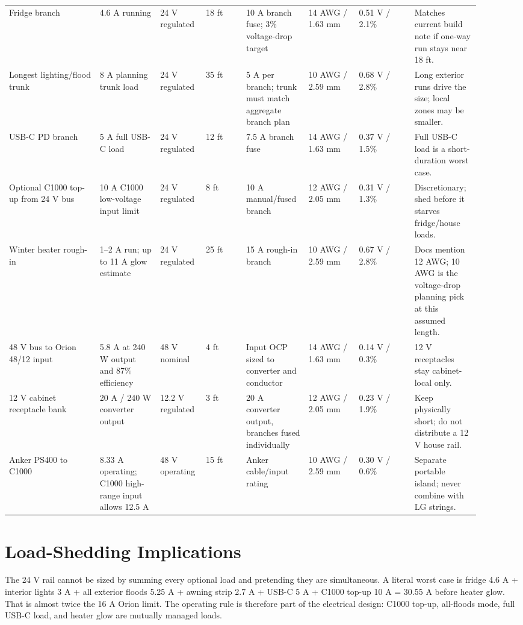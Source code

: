 \documentclass[10pt]{article}
\begin{document}
{\begin{longtable}{@{}L{0.18\linewidth}L{0.12\linewidth}L{0.07\linewidth}L{0.08\linewidth}L{0.12\linewidth}L{0.10\linewidth}L{0.11\linewidth}L{0.13\linewidth}@{}}
Fridge branch & 4.6 A running & 24 V regulated & 18 ft & 10 A branch fuse; 3\% voltage-drop target & 14 AWG / 1.63 mm & 0.51 V / 2.1\% & Matches current build note if one-way run stays near 18 ft. \\
Longest lighting/flood trunk & 8 A planning trunk load & 24 V regulated & 35 ft & 5 A per branch; trunk must match aggregate branch plan & 10 AWG / 2.59 mm & 0.68 V / 2.8\% & Long exterior runs drive the size; local zones may be smaller. \\
USB-C PD branch & 5 A full USB-C load & 24 V regulated & 12 ft & 7.5 A branch fuse & 14 AWG / 1.63 mm & 0.37 V / 1.5\% & Full USB-C load is a short-duration worst case. \\
Optional C1000 top-up from 24 V bus & 10 A C1000 low-voltage input limit & 24 V regulated & 8 ft & 10 A manual/fused branch & 12 AWG / 2.05 mm & 0.31 V / 1.3\% & Discretionary; shed before it starves fridge/house loads. \\
Winter heater rough-in & 1--2 A run; up to 11 A glow estimate & 24 V regulated & 25 ft & 15 A rough-in branch & 10 AWG / 2.59 mm & 0.67 V / 2.8\% & Docs mention 12 AWG; 10 AWG is the voltage-drop planning pick at this assumed length. \\
48 V bus to Orion 48/12 input & 5.8 A at 240 W output and 87\% efficiency & 48 V nominal & 4 ft & Input OCP sized to converter and conductor & 14 AWG / 1.63 mm & 0.14 V / 0.3\% & 12 V receptacles stay cabinet-local only. \\
12 V cabinet receptacle bank & 20 A / 240 W converter output & 12.2 V regulated & 3 ft & 20 A converter output, branches fused individually & 12 AWG / 2.05 mm & 0.23 V / 1.9\% & Keep physically short; do not distribute a 12 V house rail. \\
Anker PS400 to C1000 & 8.33 A operating; C1000 high-range input allows 12.5 A & 48 V operating & 15 ft & Anker cable/input rating & 10 AWG / 2.59 mm & 0.30 V / 0.6\% & Separate portable island; never combine with LG strings. \\
\bottomrule
\end{longtable}
}

\section*{Load-Shedding Implications}

The 24 V rail cannot be sized by summing every optional load and pretending they are simultaneous. A literal worst case is fridge 4.6 A + interior lights 3 A + all exterior floods 5.25 A + awning strip 2.7 A + USB-C 5 A + C1000 top-up 10 A = 30.55 A before heater glow. That is almost twice the 16 A Orion limit. The operating rule is therefore part of the electrical design: C1000 top-up, all-floods mode, full USB-C load, and heater glow are mutually managed loads.
\end{document}
